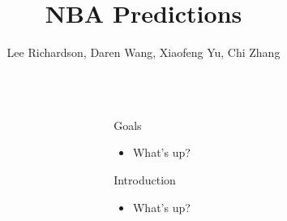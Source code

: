 \documentclass[final]{beamer}
\title{NBA Predictions}%
\author{Lee Richardson, Daren Wang, Xiaofeng Yu, Chi Zhang} %
\institute{Carnegie Mellon University} %
\newlength{\sepwid}
\newlength{\onecolwid}
\begin{document}

\setlength{\belowcaptionskip}{2ex} %
\setlength\belowdisplayshortskip{2ex} %

\begin{frame}[t] %

\begin{columns}[t] %

\begin{column}{\sepwid}\end{column} %

\begin{column}{\onecolwid} %


\begin{block}{Goals}

\begin{itemize}

  \item What's up?

\end{itemize}

\end{block}


\begin{block}{Introduction}
  
\begin{itemize}

  \item What's up?

\end{itemize}

\end{block}


\end{column}
\end{columns}
\end{frame}
\end{document}
